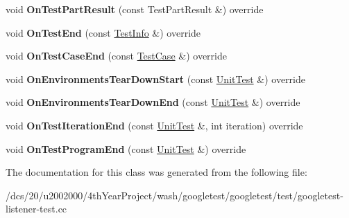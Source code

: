 \begin{DoxyCompactItemize}
void {\bfseries On\+Test\+Part\+Result} (const Test\+Part\+Result \&) override
\item 
\mbox{\label{classtesting_1_1internal_1_1EventRecordingListener_ab374bf69a73cd7dd8fcef5aea1209728}} 
void {\bfseries On\+Test\+End} (const \mbox{\hyperlink{classtesting_1_1TestInfo}{Test\+Info}} \&) override
\item 
\mbox{\label{classtesting_1_1internal_1_1EventRecordingListener_a52788314427f5c7a4585ea0bf5f3c251}} 
void {\bfseries On\+Test\+Case\+End} (const \mbox{\hyperlink{classtesting_1_1TestSuite}{Test\+Case}} \&) override
\item 
\mbox{\label{classtesting_1_1internal_1_1EventRecordingListener_aab8379a206927984cdb7b84399a122a5}} 
void {\bfseries On\+Environments\+Tear\+Down\+Start} (const \mbox{\hyperlink{classtesting_1_1UnitTest}{Unit\+Test}} \&) override
\item 
\mbox{\label{classtesting_1_1internal_1_1EventRecordingListener_ab96b8b58a318ebe79df4295e2da6a289}} 
void {\bfseries On\+Environments\+Tear\+Down\+End} (const \mbox{\hyperlink{classtesting_1_1UnitTest}{Unit\+Test}} \&) override
\item 
\mbox{\label{classtesting_1_1internal_1_1EventRecordingListener_a48f6f53c044e8cb6425f9bc7319ddecc}} 
void {\bfseries On\+Test\+Iteration\+End} (const \mbox{\hyperlink{classtesting_1_1UnitTest}{Unit\+Test}} \&, int iteration) override
\item 
\mbox{\label{classtesting_1_1internal_1_1EventRecordingListener_a22952f706a15c028d4b43256602035bb}} 
void {\bfseries On\+Test\+Program\+End} (const \mbox{\hyperlink{classtesting_1_1UnitTest}{Unit\+Test}} \&) override
\end{DoxyCompactItemize}


The documentation for this class was generated from the following file\+:\begin{DoxyCompactItemize}
\item 
/dcs/20/u2002000/4th\+Year\+Project/wash/googletest/googletest/test/googletest-\/listener-\/test.\+cc\end{DoxyCompactItemize}

